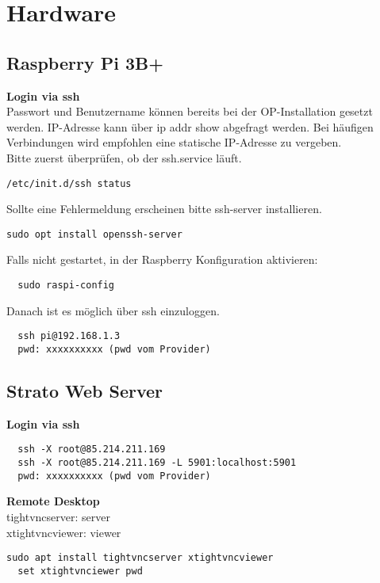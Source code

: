 \newpage
\section{Hardware}

\subsection{Raspberry Pi 3B+}
\textbf{Login via ssh}\\
Passwort und Benutzername können bereits bei der OP-Installation gesetzt werden. IP-Adresse kann über ip addr show abgefragt werden. Bei häufigen Verbindungen wird empfohlen eine statische IP-Adresse zu vergeben.\\

Bitte zuerst überprüfen, ob der ssh.service läuft.
\begin{verbatim}
/etc/init.d/ssh status
\end{verbatim}
Sollte eine Fehlermeldung erscheinen bitte ssh-server installieren.
\begin{verbatim}
sudo opt install openssh-server
\end{verbatim}
Falls nicht gestartet, in der Raspberry Konfiguration aktivieren:
\begin{verbatim}
  sudo raspi-config
\end{verbatim}
Danach ist es möglich über ssh einzuloggen.
\begin{verbatim}
  ssh pi@192.168.1.3
  pwd: xxxxxxxxxx (pwd vom Provider)
\end{verbatim}

\subsection{Strato Web Server}
\textbf{Login via ssh}
\begin{verbatim}
  ssh -X root@85.214.211.169
  ssh -X root@85.214.211.169 -L 5901:localhost:5901
  pwd: xxxxxxxxxx (pwd vom Provider)
\end{verbatim}
\textbf{Remote Desktop}\\
tightvncserver: server\\
xtightvncviewer: viewer
\begin{verbatim}sudo apt install tightvncserver xtightvncviewer
  set xtightvnciewer pwd
\end{verbatim}

